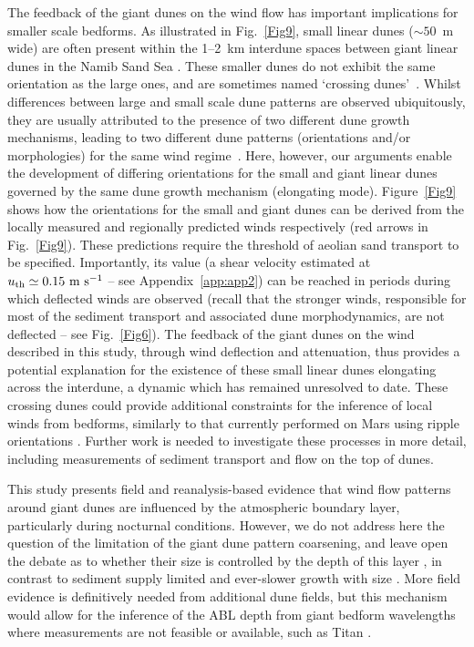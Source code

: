 The feedback of the giant dunes on the wind flow has important implications for smaller scale bedforms. As illustrated in Fig.~\ref{Fig9}, small linear dunes ($\sim50$~m wide) are often present within the 1--2~km interdune spaces between giant linear dunes in the Namib Sand Sea \citep{Livingstone2010}. These smaller dunes do not exhibit the same orientation as the large ones, and are sometimes named `crossing dunes'~\citep{Chand22}. Whilst differences between large and small scale dune patterns are observed ubiquitously, they are usually attributed to the presence of two different dune growth mechanisms, leading to two different dune patterns (orientations and/or morphologies) for the same wind regime~\citep{Courrech2014, Runyon2017, lu2017, Song2019, Gadal2020, Hu2021}. Here, however, our arguments enable the development of differing orientations for the small and giant linear dunes governed by the same dune growth mechanism (elongating mode). Figure~\ref{Fig9} shows how the orientations for the small and giant dunes can be derived from the locally measured and regionally predicted winds respectively (red arrows in Fig.~\ref{Fig9}). These predictions require the threshold of aeolian sand transport to be specified. Importantly, its value (a shear velocity estimated at $u_{\textup{th}} \simeq 0.15~\textup{m}~\textup{s}^{-1}$ -- see Appendix~\ref{app:app2}) can be reached in periods during which deflected winds are observed (recall that the stronger winds, responsible for most of the sediment transport and associated dune morphodynamics, are not deflected -- see Fig.~\ref{Fig6}). The feedback of the giant dunes on the wind described in this study, through wind deflection and attenuation, thus provides a potential explanation for the existence of these small linear dunes elongating across the interdune, a dynamic which has remained unresolved to date. These crossing dunes could provide additional constraints for the inference of local winds from bedforms, similarly to that currently performed on Mars using ripple orientations \citep{Liu2015, Hood2021}. Further work is needed to investigate these processes in more detail, including measurements of sediment transport and flow on the top of dunes.

This study presents field and reanalysis-based evidence that wind flow patterns around giant dunes are influenced by the atmospheric boundary layer, particularly during nocturnal conditions. However, we do not address here the question of the limitation of the giant dune pattern coarsening, and leave open the debate as to whether their size is controlled by the depth of this layer \citep{Andreotti2009}, in contrast to sediment supply limited and ever-slower growth with size \citep{Werner1999, Gunn2022}. More field evidence is definitively needed from additional dune fields, but this mechanism would allow for the inference of the ABL depth from giant bedform wavelengths where measurements are not feasible or available, such as Titan \citep{Lorenz2010}.


